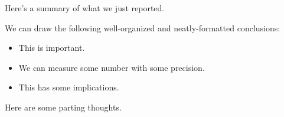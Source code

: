 \documentclass[\docopts]{\docclass}
\begin{document}
Here's a summary of what we just reported.

We can draw the following well-organized and neatly-formatted conclusions:
\begin{itemize}
  \item This is important.
  \item We can measure some number with some precision.
  \item This has some implications.
\end{itemize}

Here are some parting thoughts.

%
%
%
%
%
%
%
%
\end{document}
